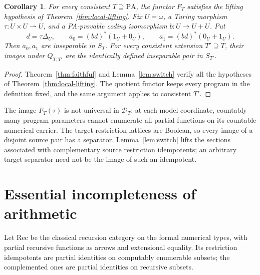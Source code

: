 \documentclass[11pt]{article}
\newtheorem{corollary}[theorem]{Corollary}
\newcommand{\PA}{\mathrm{PA}}
\begin{document}
\begin{corollary}\label{cor:pair}
For every consistent $T\supseteq\PA$, the functor $F_T$ satisfies the
lifting hypothesis of Theorem~\ref{thm:local-lifting}.
Fix $U=\omega$, a Turing morphism $\tau:U\times U\rightharpoonup U$,
and a PA-provable coding isomorphism $b:U\to U+U$. Put
\[
 d=\tau\Delta_U,\qquad
 a_0=(bd)^*(1_U+0_U),\qquad a_1=(bd)^*(0_U+1_U).
\]
Then $a_0,a_1$ are inseparable in $S_T$. For every consistent
extension $T'\supseteq T$, their images under $Q_{T,T'}$ are the
identically defined inseparable pair in $S_{T'}$.
\end{corollary}
\begin{proof}
Theorem~\ref{thm:faithful} and Lemma~\ref{lem:switch} verify all the
hypotheses of Theorem~\ref{thm:local-lifting}. The quotient functor keeps
every program in the definition fixed, and the same argument applies
to consistent $T'$.
\end{proof}

The image $F_T(\tau)$ is not universal in $\mathcal D_T$: at each
model coordinate, countably many program parameters cannot enumerate
all partial functions on its countable numerical carrier. The target
restriction lattices are Boolean, so every image of a disjoint source
pair has a separator. Lemma~\ref{lem:switch} lifts the sections
associated with complementary source restriction idempotents;
an arbitrary target separator need not be the image of such an
idempotent.

\section{Essential incompleteness of arithmetic}\label{sec:arithmetic}

Let $\mathrm{Rec}$ be the classical recursion category on the formal
numerical types, with partial recursive functions as arrows and extensional
equality. Its restriction idempotents are partial identities on
computably enumerable subsets; the complemented ones are partial
identities on recursive subsets.
\end{document}
